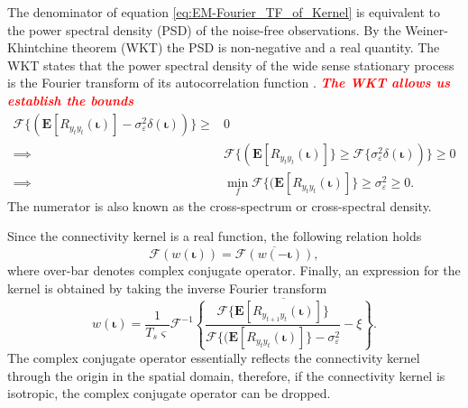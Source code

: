 \documentclass[]{article}
\newcommand{\dean}[1]{\textsf{\emph{\textbf{\textcolor{red}{#1}}}}}
\begin{document}
The denominator of equation \eqref{eq:EM-Fourier_TF_of_Kernel} is equivalent to the power spectral density (PSD) of the noise-free observations. By the Weiner-Khintchine theorem (WKT) the PSD is non-negative and a real quantity. The WKT states that the power spectral density of the wide sense stationary process is the Fourier transform of its autocorrelation function \cite{Ricker2003}. \dean{The WKT allows us establish the bounds}
\begin{align}
	\mathcal{F}\{(\mathbf{E}\left[R_{y_ty_t}(\boldsymbol\iota)\right] - \sigma_{\varepsilon}^2 \delta(\boldsymbol\iota))\}\ge&0 \\
	\implies & \mathcal{F}\{(\mathbf{E}\left[R_{y_ty_t}(\boldsymbol\iota)\right]\}\ge\mathcal{F}\{\sigma_{\varepsilon}^2 \delta(\boldsymbol\iota))\}\ge0 \\
	\implies & \min_f\mathcal{F}\{(\mathbf{E}\left[R_{y_ty_t}(\boldsymbol\iota)\right]\}\ge\sigma_{\varepsilon}^2\ge0. \label{eq:BoundOnObsVariance}
\end{align}
The numerator is also known as the cross-spectrum or cross-spectral density. 

Since the connectivity kernel is a real function, the following relation holds \cite{Bracewell2000}
\begin{equation}
 \mathcal{F}\left(w(\boldsymbol\iota)\right)=\overline{\mathcal{F}\left(w(-\boldsymbol\iota)\right)},
\end{equation}
where over-bar denotes complex conjugate operator. Finally, an expression for the kernel is obtained by taking the inverse Fourier transform 
\begin{equation}\label{eq:KernelSolution}
	w(\boldsymbol\iota) = \frac{1}{T_s\varsigma }\mathcal{F}^{-1}\overline{\left\{\frac{\mathcal{F}\{\mathbf{E}[R_{y_{t+1}y_t}(\boldsymbol{\iota})]\}}{\mathcal{F}\{(\mathbf{E}\left[R_{y_ty_t}(\boldsymbol\iota)\right]\} - \sigma_{\varepsilon}^2 }-\xi\right\}}.
\end{equation}
The complex conjugate operator essentially reflects the connectivity kernel through the origin in the spatial domain, therefore, if the connectivity kernel is isotropic, the complex conjugate operator can be dropped. 
\end{document}
